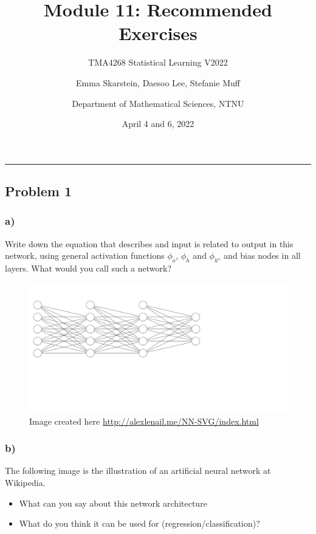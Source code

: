 \documentclass[]{article}
\title{Module 11: Recommended Exercises}
\subtitle{TMA4268 Statistical Learning V2022}
\author{Emma Skarstein, Daesoo Lee, Stefanie Muff \and Department of Mathematical Sciences, NTNU}
\date{April 4 and 6, 2022}
\providecommand{\tightlist}{%
  \setlength{\itemsep}{0pt}\setlength{\parskip}{0pt}}
\begin{document}
\maketitle

\begin{center}\rule{0.5\linewidth}{0.5pt}\end{center}

\hypertarget{problem-1}{%
\subsection{Problem 1}\label{problem-1}}

\hypertarget{a}{%
\subsubsection{a)}\label{a}}

Write down the equation that describes and input is related to output in
this network, using general activation functions \(\phi_o\), \(\phi_h\)
and \(\phi_{h^\star}\) and bias nodes in all layers. What would you call
such a network?

\begin{figure}
\centering
\includegraphics[width=1\textwidth,height=\textheight]{nn.png}
\caption{Image created here
\url{http://alexlenail.me/NN-SVG/index.html}}
\end{figure}

\hypertarget{b}{%
\subsubsection{b)}\label{b}}

The following image is the illustration of an artificial neural network
at Wikipedia.

\begin{itemize}
\tightlist
\item
  What can you say about this network architecture
\item
  What do you think it can be used for (regression/classification)?
\end{itemize}
\end{document}

